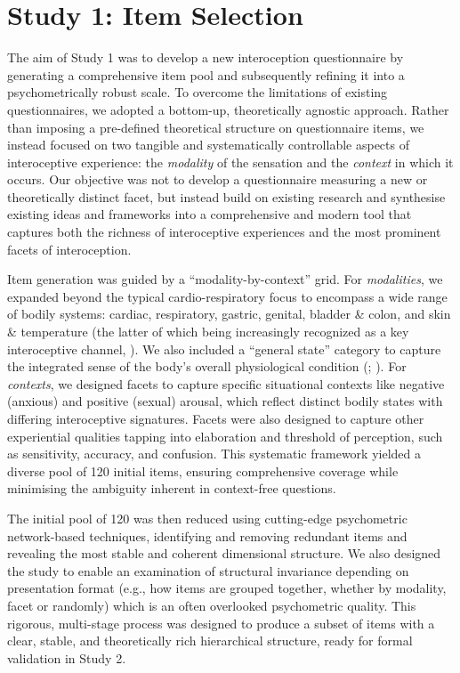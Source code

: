 \documentclass[
  jou,
  floatsintext,
  longtable,
  nolmodern,
  notxfonts,
  notimes,
  colorlinks=true,linkcolor=blue,citecolor=blue,urlcolor=blue]{apa7}
\begin{document}
\section{Study 1: Item Selection}\label{study-1-item-selection}

The aim of Study 1 was to develop a new interoception questionnaire by
generating a comprehensive item pool and subsequently refining it into a
psychometrically robust scale. To overcome the limitations of existing
questionnaires, we adopted a bottom-up, theoretically agnostic approach.
Rather than imposing a pre-defined theoretical structure on
questionnaire items, we instead focused on two tangible and
systematically controllable aspects of interoceptive experience: the
\emph{modality} of the sensation and the \emph{context} in which it
occurs. Our objective was not to develop a questionnaire measuring a new
or theoretically distinct facet, but instead build on existing research
and synthesise existing ideas and frameworks into a comprehensive and
modern tool that captures both the richness of interoceptive experiences
and the most prominent facets of interoception.

Item generation was guided by a ``modality-by-context'' grid. For
\emph{modalities}, we expanded beyond the typical cardio-respiratory
focus to encompass a wide range of bodily systems: cardiac, respiratory,
gastric, genital, bladder \& colon, and skin \& temperature (the latter
of which being increasingly recognized as a key interoceptive channel,
). We
also included a ``general state'' category to capture the integrated
sense of the body's overall physiological condition
(;
). For
\emph{contexts}, we designed facets to capture specific situational
contexts like negative (anxious) and positive (sexual) arousal, which
reflect distinct bodily states with differing interoceptive signatures.
Facets were also designed to capture other experiential qualities
tapping into elaboration and threshold of perception, such as
sensitivity, accuracy, and confusion. This systematic framework yielded
a diverse pool of 120 initial items, ensuring comprehensive coverage
while minimising the ambiguity inherent in context-free questions.

The initial pool of 120 was then reduced using cutting-edge psychometric
network-based techniques, identifying and removing redundant items and
revealing the most stable and coherent dimensional structure. We also
designed the study to enable an examination of structural invariance
depending on presentation format (e.g., how items are grouped together,
whether by modality, facet or randomly) which is an often overlooked
psychometric quality. This rigorous, multi-stage process was designed to
produce a subset of items with a clear, stable, and theoretically rich
hierarchical structure, ready for formal validation in Study 2.
\end{document}
